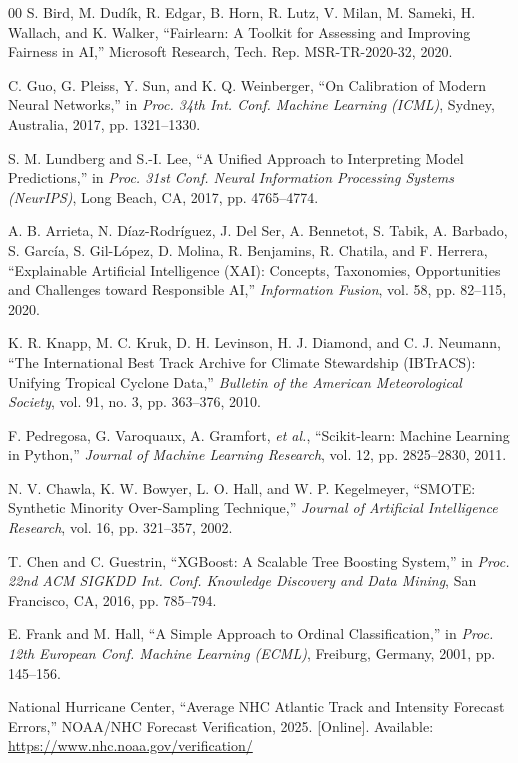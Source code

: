 \documentclass[conference]{IEEEtran}
\renewcommand{\_}{\origunderscore\allowbreak}
\begin{document}
\begin{thebibliography}{00}
S. Bird, M. Dud\'{i}k, R. Edgar, B. Horn, R. Lutz, V. Milan,
M. Sameki, H. Wallach, and K. Walker,
``Fairlearn: A Toolkit for Assessing and Improving Fairness in
AI,'' Microsoft Research, Tech. Rep. MSR-TR-2020-32, 2020.

C. Guo, G. Pleiss, Y. Sun, and K. Q. Weinberger,
``On Calibration of Modern Neural Networks,''
in \textit{Proc. 34th Int. Conf. Machine Learning (ICML)},
Sydney, Australia, 2017, pp. 1321--1330.

S. M. Lundberg and S.-I. Lee,
``A Unified Approach to Interpreting Model Predictions,''
in \textit{Proc. 31st Conf. Neural Information Processing
Systems (NeurIPS)}, Long Beach, CA, 2017, pp. 4765--4774.

A. B. Arrieta, N. D\'{i}az-Rodr\'{i}guez, J. Del Ser,
A. Bennetot, S. Tabik, A. Barbado, S. Garc\'{i}a,
S. Gil-L\'{o}pez, D. Molina, R. Benjamins, R. Chatila, and
F. Herrera,
``Explainable Artificial Intelligence (XAI): Concepts,
Taxonomies, Opportunities and Challenges toward Responsible AI,''
\textit{Information Fusion}, vol. 58, pp. 82--115, 2020.

K. R. Knapp, M. C. Kruk, D. H. Levinson, H. J. Diamond,
and C. J. Neumann,
``The International Best Track Archive for Climate Stewardship
(IBTrACS): Unifying Tropical Cyclone Data,''
\textit{Bulletin of the American Meteorological Society},
vol. 91, no. 3, pp. 363--376, 2010.

F. Pedregosa, G. Varoquaux, A. Gramfort, \textit{et al.},
``Scikit-learn: Machine Learning in Python,''
\textit{Journal of Machine Learning Research},
vol. 12, pp. 2825--2830, 2011.

N. V. Chawla, K. W. Bowyer, L. O. Hall, and W. P. Kegelmeyer,
``SMOTE: Synthetic Minority Over-Sampling Technique,''
\textit{Journal of Artificial Intelligence Research},
vol. 16, pp. 321--357, 2002.

T. Chen and C. Guestrin,
``XGBoost: A Scalable Tree Boosting System,''
in \textit{Proc. 22nd ACM SIGKDD Int. Conf. Knowledge Discovery
and Data Mining}, San Francisco, CA, 2016, pp. 785--794.

E. Frank and M. Hall,
``A Simple Approach to Ordinal Classification,''
in \textit{Proc. 12th European Conf. Machine Learning (ECML)},
Freiburg, Germany, 2001, pp. 145--156.

National Hurricane Center,
``Average NHC Atlantic Track and Intensity Forecast Errors,''
NOAA/NHC Forecast Verification, 2025.
[Online]. Available: \url{https://www.nhc.noaa.gov/verification/}

\end{thebibliography}
\end{document}
